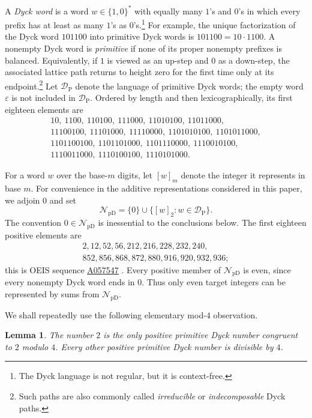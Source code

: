 \documentclass[12pt]{article}
\theoremstyle{plain}
\newtheorem{lemma}[theorem]{Lemma}
\theoremstyle{definition}
\theoremstyle{plain}
\newcommand{\val}[2]{[#1]_{#2}}
\newcommand{\NpD}{\mathcal{N}_{\mathrm{pD}}}
\newcommand{\DP}{\mathcal{D}_{\mathrm{P}}}
\newcommand{\seqnum}[1]{\href{https://oeis.org/#1}{\rm \underline{#1}}}
\begin{document}
A \emph{Dyck word} is a word $w\in\{1,0\}^*$ with equally many $1$'s
and $0$'s in which every prefix has at least as many $1$'s as $0$'s.\footnote{The
Dyck language is not regular, but it is context-free.}  For example, the
unique factorization of the Dyck word $101100$ into primitive Dyck words is
$101100=10\cdot1100$.  A nonempty Dyck word is \emph{primitive} if none of
its proper nonempty prefixes is balanced.  Equivalently, if $1$ is viewed as
an up-step and $0$ as a down-step, the associated lattice path returns to
height zero for the first time only at its endpoint.\footnote{Such paths are
also commonly called \emph{irreducible} or \emph{indecomposable} Dyck paths.}
Let $\DP$ denote the language of primitive Dyck words; the empty word
$\varepsilon$ is not included in $\DP$.  Ordered by length and then
lexicographically, its first eighteen elements are
\[
\begin{gathered}
10,\ 1100,\ 110100,\ 111000,\ 11010100,\ 11011000,\\
11100100,\ 11101000,\ 11110000,\ 1101010100,\ 1101011000,\\
1101100100,\ 1101101000,\ 1101110000,\ 1110010100,\\
1110011000,\ 1110100100,\ 1110101000.
\end{gathered}
\]

For a word $w$ over the base-$m$ digits, let $\val{w}{m}$ denote the
integer it represents in base $m$.  For convenience in the additive
representations considered in this paper, we adjoin $0$ and set
\[
 \NpD=\{0\}\cup\{\val{w}{2}:w\in\DP\}.
\]
The convention $0\in\NpD$ is inessential to the conclusions below.  The
first eighteen positive elements are
\[
\begin{gathered}
2,12,52,56,212,216,228,232,240,\\
852,856,868,872,880,916,920,932,936;
\end{gathered}
\]
this is OEIS sequence \seqnum{A057547} \cite{OEIS-A057547}.  Every positive
member of $\NpD$ is even, since every nonempty Dyck word ends in $0$.
Thus only even target integers can be represented by sums from $\NpD$.

We shall repeatedly use the following elementary mod-$4$ observation.

\begin{lemma}\label{lem:mod4}
The number $2$ is the only positive primitive Dyck number congruent to
$2$ modulo $4$.  Every other positive primitive Dyck number is divisible
by $4$.
\end{lemma}
\end{document}
